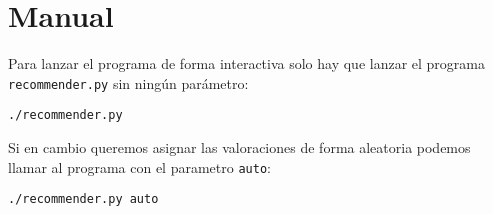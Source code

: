 \chapter{Manual}

Para lanzar el programa de forma interactiva solo hay que lanzar el programa
\texttt{recommender.py} sin ningún parámetro:

\begin{lstlisting}
./recommender.py
\end{lstlisting}

Si en cambio queremos asignar las valoraciones de forma aleatoria podemos llamar al programa con el parametro \texttt{auto}:
\begin{lstlisting}
./recommender.py auto
\end{lstlisting}
